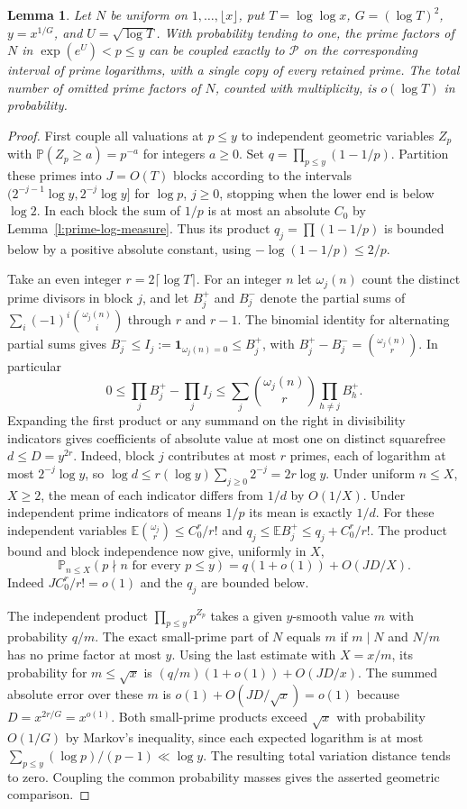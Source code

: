 \documentclass[11pt]{article}
\newtheorem{lemma}[theorem]{Lemma}
\numberwithin{equation}{section}
\newcommand{\PP}{\mathbb P}
\newcommand{\EE}{\mathbb E}
\newcommand{\one}{\mathbf 1}
\begin{document}
\begin{lemma}\label{l:arithmetic-coupling}
Let $N$ be uniform on $1,\ldots,\lfloor x\rfloor$, put
$T=\log\log x$, $G=(\log T)^2$, $y=x^{1/G}$, and
$U=\sqrt{\log T}$. With probability tending to one, the prime
factors of $N$ in $\exp(e^U)<p\le y$ can be coupled exactly to
$\mathcal P$ on the corresponding interval of prime logarithms,
with a single copy of every retained prime. The total number of
omitted prime factors of $N$, counted with multiplicity, is
$o(\log T)$ in probability.
\end{lemma}
\begin{proof}
First couple all valuations at $p\le y$ to independent geometric
variables $Z_p$ with $\PP(Z_p\ge a)=p^{-a}$ for integers $a\ge0$.
Set $q=\prod_{p\le y}(1-1/p)$. Partition these primes into $J=O(T)$
blocks according to the intervals
$(2^{-j-1}\log y,2^{-j}\log y]$ for $\log p$, $j\ge0$, stopping
when the lower end is below $\log2$. In each block the sum of $1/p$
is at most an absolute $C_0$ by Lemma~\ref{l:prime-log-measure}.
Thus its product $q_j=\prod(1-1/p)$ is bounded below by a positive
absolute constant, using $-\log(1-1/p)\le2/p$.

Take an even integer $r=2\lceil\log T\rceil$. For an integer $n$
let $\omega_j(n)$ count the distinct prime divisors in block $j$,
and let $B_j^+$ and $B_j^-$ denote the partial sums of
$\sum_i(-1)^i\binom{\omega_j(n)}i$ through $r$ and $r-1$.
The binomial identity for alternating partial sums gives
$B_j^-\le I_j:=\one_{\omega_j(n)=0}\le B_j^+$, with
$B_j^+-B_j^-=\binom{\omega_j(n)}r$. In particular
\[
 0\le\prod_j B_j^+-\prod_j I_j
 \le\sum_j\binom{\omega_j(n)}r\prod_{h\ne j}B_h^+.
\]
Expanding the first product or any summand on the right in
divisibility indicators gives coefficients of absolute value at
most one on distinct squarefree $d\le D=y^{2r}$. Indeed, block
$j$ contributes at most $r$ primes, each of logarithm at most
$2^{-j}\log y$, so $\log d\le r(\log y)\sum_{j\ge0}2^{-j}=2r\log y$.
Under uniform $n\le X$, $X\ge2$,
the mean of each indicator differs from $1/d$ by $O(1/X)$.
Under independent prime indicators of means $1/p$ its mean is
exactly $1/d$. For these independent variables
$\EE\binom{\omega_j}r\le C_0^r/r!$ and
$q_j\le\EE B_j^+\le q_j+C_0^r/r!$.
The product bound and block independence now give, uniformly in $X$,
\[
 \PP_{n\le X}(p\nmid n\text{ for every }p\le y)
   =q(1+o(1))+O(JD/X).
\]
Indeed $J C_0^r/r!=o(1)$ and the $q_j$ are bounded below.

The independent product $\prod_{p\le y}p^{Z_p}$ takes a given
$y$-smooth value $m$ with probability $q/m$. The exact small-prime
part of $N$ equals $m$ if $m\mid N$ and $N/m$ has no prime factor
at most $y$. Using the last estimate with $X=x/m$, its probability
for $m\le\sqrt x$ is $(q/m)(1+o(1))+O(JD/x)$. The summed absolute
error over these $m$ is $o(1)+O(JD/\sqrt x)=o(1)$ because
$D=x^{2r/G}=x^{o(1)}$. Both small-prime products exceed $\sqrt x$
with probability $O(1/G)$ by Markov's inequality, since each
expected logarithm is at most $\sum_{p\le y}(\log p)/(p-1)\ll\log y$.
The resulting total variation distance tends to zero. Coupling the
common probability masses gives the asserted geometric comparison.


\end{proof}
\end{document}
